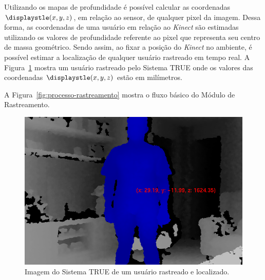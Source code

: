	Utilizando os mapas de profundidade é possível calcular as coordenadas$\displaystle (x,y,z)$, em relação ao sensor, de qualquer pixel da imagem. Dessa forma, as coordenadas de uma usuário em relação ao \textit{Kinect} são estimadas utilizando os valores de profundidade referente ao pixel que representa seu centro de massa geométrico. Sendo assim, ao fixar a posição do \textit{Kinect} no ambiente, é possível estimar a localização de qualquer usuário rastreado em tempo real. A Figura~\ref{fig:localizacao} mostra um usuário rastreado pelo Sistema TRUE onde os valores das coordenadas $\displaystle (x,y,z)$ estão em milímetros.

	A Figura~\ref{fig:processo-rastreamento} mostra o fluxo básico do Módulo de Rastreamento.

	\begin{figure}[H]
		\begin{center}
			\includegraphics[scale=0.45]{figuras/4.ProblemaEProposta/localizacao.png}
		\end{center}
		\caption{Imagem do Sistema TRUE de um usuário rastreado e localizado.}
		\label{fig:localizacao}
	\end{figure}
	

